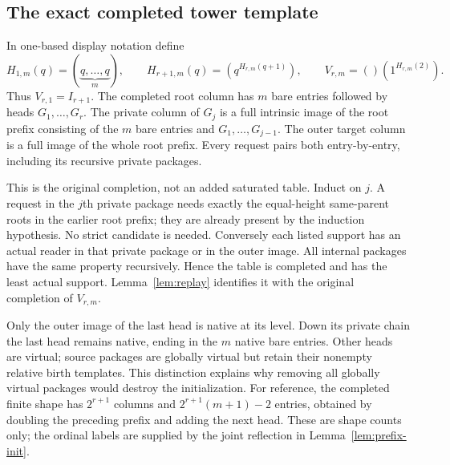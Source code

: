 \subsection{The exact completed tower template}\label{sec:tower-template}
In one-based display notation define
\[
 H_{1,m}(q)=(\underbrace{q,\ldots,q}_{m}),\qquad
 H_{r+1,m}(q)=(q^{H_{r,m}(q+1)}),\qquad
 V_{r,m}=()(1^{H_{r,m}(2)}).
\]
Thus $V_{r,1}=I_{r+1}$. The completed root column has $m$ bare
entries followed by heads $G_1,\ldots,G_r$. The private column of
$G_j$ is a full intrinsic image of the root prefix consisting of
the $m$ bare entries and $G_1,\ldots,G_{j-1}$. The outer target column
is a full image of the whole root prefix. Every request pairs both
entry-by-entry, including its recursive private packages.

This is the original completion, not an added saturated table. Induct
on $j$. A request in the $j$th private package needs exactly the
equal-height same-parent roots in the earlier root prefix; they are
already present by the induction hypothesis. No strict candidate is
needed. Conversely each listed support has an actual reader in that
private package or in the outer image. All internal packages have the
same property recursively. Hence the table is completed and has the
least actual support. Lemma~\ref{lem:replay} identifies it with the
original completion of $V_{r,m}$.

Only the outer image of the last head is native at its level. Down its
private chain the last head remains native, ending in the $m$ native
bare entries. Other heads are virtual; source packages are globally
virtual but retain their nonempty relative birth templates. This
distinction explains why removing all globally virtual packages would
destroy the initialization. For reference, the completed finite shape
has $2^{r+1}$ columns and $2^{r+1}(m+1)-2$ entries, obtained by doubling
the preceding prefix and adding the next head. These are shape counts
only; the ordinal labels are supplied by the joint reflection in
Lemma~\ref{lem:prefix-init}.
